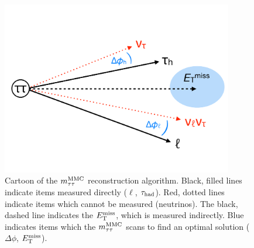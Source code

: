 \begin{figure}[tp]
  \centering
  \includegraphics[width=0.90\textwidth]{figures/mtautau/mmc-cartoon}
  \caption{Cartoon of the $m_{\tau\tau}^\text{MMC}$ reconstruction algorithm. Black, filled lines indicate items measured directly ($\ell$, $\tau_\text{had}$). Red, dotted lines indicate items which cannot be measured (neutrinos). The black, dashed line indicates the $E_{\mathrm{T}}^{\mathrm{miss}}$, which is measured indirectly. Blue indicates items which the $m_{\tau\tau}^\text{MMC}$ scans to find an optimal solution ($\Delta\phi$, $E_{\mathrm{T}}^{\mathrm{miss}}$).}
  \label{fig:strategy-mtautau-cartoon}
\end{figure}

